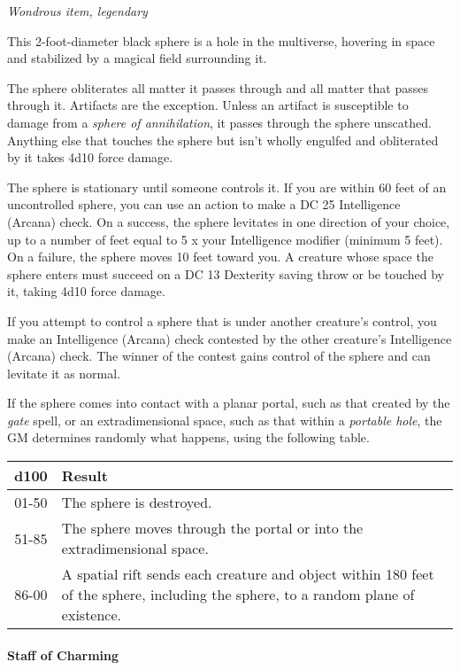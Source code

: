 \documentclass[
]{article}
\begin{document}
\emph{Wondrous item, legendary}

This 2-foot-diameter black sphere is a hole in the multiverse, hovering
in space and stabilized by a magical field surrounding it.

The sphere obliterates all matter it passes through and all matter that
passes through it. Artifacts are the exception. Unless an artifact is
susceptible to damage from a \emph{sphere of annihilation}, it passes
through the sphere unscathed. Anything else that touches the sphere but
isn't wholly engulfed and obliterated by it takes 4d10 force damage.

The sphere is stationary until someone controls it. If you are within 60
feet of an uncontrolled sphere, you can use an action to make a DC 25
Intelligence (Arcana) check. On a success, the sphere levitates in one
direction of your choice, up to a number of feet equal to 5 x your
Intelligence modifier (minimum 5 feet). On a failure, the sphere moves
10 feet toward you. A creature whose space the sphere enters must
succeed on a DC 13 Dexterity saving throw or be touched by it, taking
4d10 force damage.

If you attempt to control a sphere that is under another creature's
control, you make an Intelligence (Arcana) check contested by the other
creature's Intelligence (Arcana) check. The winner of the contest gains
control of the sphere and can levitate it as normal.

If the sphere comes into contact with a planar portal, such as that
created by the \emph{gate} spell, or an extradimensional space, such as
that within a \emph{portable hole}, the GM determines randomly what
happens, using the following table.

\begin{longtable}[]{@{}cl@{}}
\toprule
d100 & Result\tabularnewline
\midrule
\endhead
01-50 & The sphere is destroyed.\tabularnewline
51-85 & The sphere moves through the portal or into the extradimensional
space.\tabularnewline
86-00 & A spatial rift sends each creature and object within 180 feet of
the sphere, including the sphere, to a random plane of
existence.\tabularnewline
\bottomrule
\end{longtable}

\hypertarget{staff-of-charming}{%
\paragraph{Staff of Charming}\label{staff-of-charming}}
\end{document}
